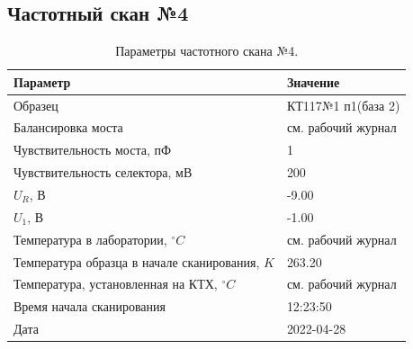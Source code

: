 \subsection{Частотный скан №4}
\begin{table}[!ht]
    \centering
    \caption{Параметры частотного скана №4.}
    \begin{tabular}{|l|l|}
        \hline
        Параметр                                       & Значение                  \\ \hline
        Образец                                        & КТ117№1 п1(база 2)        \\ \hline
        Балансировка моста                             & см. рабочий журнал        \\ \hline
        Чувствительность моста, пФ                     & 1                         \\ \hline
        Чувствительность селектора, мВ                 & 200                       \\ \hline
        $U_R$, В                                       & -9.00                     \\ \hline
        $U_1$, В                                       & -1.00                     \\ \hline
        Температура в лаборатории, $^\circ C$          & см. рабочий журнал        \\ \hline
        Температура образца в начале сканирования, $K$ & 263.20                    \\ \hline
        Температура, установленная на КТХ, $^\circ C$  & см. рабочий журнал        \\ \hline
        Время начала сканирования                      & 12:23:50                  \\ \hline
        Дата                                           & 2022-04-28                \\ \hline
    \end{tabular}
    \label{table:frequency_scan_4}
\end{table}

